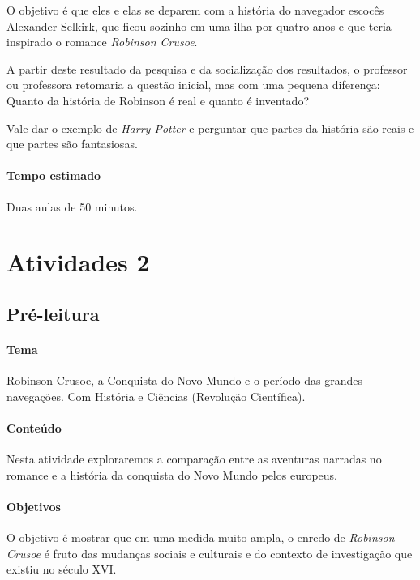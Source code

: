 \documentclass[12pt]{extarticle}
\begin{document}
O objetivo é que eles e elas se deparem com a história do navegador
escocês Alexander Selkirk, que ficou sozinho em uma ilha por quatro anos
e que teria inspirado o romance \emph{Robinson Crusoe}.


A partir deste resultado da pesquisa e da socialização dos resultados, o
professor ou professora retomaria a questão inicial, mas com uma pequena
diferença: Quanto da história de Robinson é real e quanto é inventado?

Vale dar o exemplo de \emph{Harry Potter} e perguntar que partes da
história são reais e que partes são fantasiosas.

\paragraph{Tempo estimado} Duas aulas de 50 minutos.

\section{Atividades 2}

\subsection{Pré-leitura}

\paragraph{Tema} Robinson Crusoe, a Conquista do Novo Mundo e o período das
grandes navegações. Com História e Ciências (Revolução Científica).


\paragraph{Conteúdo}
Nesta atividade exploraremos a comparação entre as aventuras narradas no
romance e a história da conquista do Novo Mundo pelos europeus.

\paragraph{Objetivos}
O objetivo é mostrar que em uma medida muito ampla, o enredo de
\emph{Robinson Crusoe} é fruto das mudanças sociais e culturais e do
contexto de investigação que existiu no século XVI.
\end{document}
